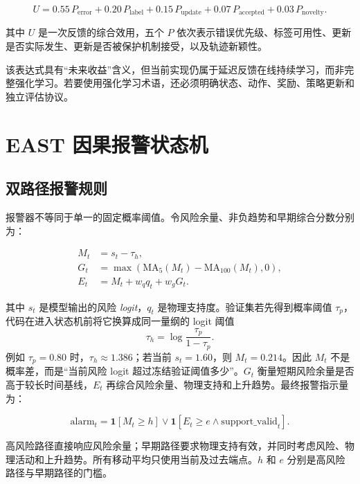 \documentclass[11pt,a4paper]{article}
\begin{document}
\begin{equation}
U=0.55\,P_{\mathrm{error}}
 +0.20\,P_{\mathrm{label}}
 +0.15\,P_{\mathrm{update}}
 +0.07\,P_{\mathrm{accepted}}
 +0.03\,P_{\mathrm{novelty}}.
\label{eq:utility}
\end{equation}

其中 \(U\) 是一次反馈的综合效用，五个 \(P\) 依次表示错误优先级、标签可用性、更新是否实际发生、更新是否被保护机制接受，以及轨迹新颖性。

该表达式具有“未来收益”含义，但当前实现仍属于延迟反馈在线持续学习，而非完整强化学习。若要使用强化学习术语，还必须明确状态、动作、奖励、策略更新和独立评估协议。

\section{EAST 因果报警状态机}

\subsection{双路径报警规则}

报警器不等同于单一的固定概率阈值。令风险余量、非负趋势和早期综合分数分别为：

\begin{align}
M_t&=s_t-\tau_h,\\
G_t&=\max\left(
\mathrm{MA}_5(M_t)-\mathrm{MA}_{100}(M_t),0\right),\\
E_t&=M_t+w_q q_t+w_gG_t.
\label{eq:trend}
\end{align}

其中 \(s_t\) 是模型输出的风险 \emph{logit}，\(q_t\) 是物理支持度。验证集若先得到概率阈值 \(\tau_p\)，代码在进入状态机前将它换算成同一量纲的 logit 阈值
\[
\tau_h=\log\frac{\tau_p}{1-\tau_p}.
\]
例如 \(\tau_p=0.80\) 时，\(\tau_h\approx1.386\)；若当前 \(s_t=1.60\)，则 \(M_t=0.214\)。因此 \(M_t\) 不是概率差，而是“当前风险 logit 超过冻结验证阈值多少”。\(G_t\) 衡量短期风险余量是否高于较长时间基线，\(E_t\) 再综合风险余量、物理支持和上升趋势。最终报警指示量为：

\begin{equation}
\mathrm{alarm}_t=
\mathbf{1}[M_t\geq h]
\lor
\mathbf{1}[E_t\geq e
\land \mathrm{support\_valid}_t].
\label{eq:alarm}
\end{equation}

高风险路径直接响应风险余量；早期路径要求物理支持有效，并同时考虑风险、物理活动和上升趋势。所有移动平均只使用当前及过去端点。\(h\) 和 \(e\) 分别是高风险路径与早期路径的门槛。
\end{document}
